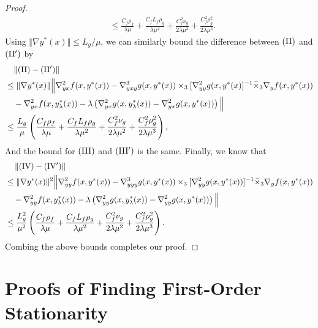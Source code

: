 \begin{proof}
\begin{align*}
    &\le \frac{C_f \rho_f}{\lambda \mu} + \frac{C_f L_f \rho_g}{\lambda \mu^2} +  \frac{C_f^2 \nu_g}{2\lambda \mu^2}+ \frac{C_f^2 \rho_g^2}{2 \lambda \mu^3} .
\end{align*}
Using $\Vert \nabla y^*(x) \Vert \le  L_g / \mu$, we can similarly bound the difference between ${\rm (II)}$ and ${\rm (II')}$ by
{ \begin{align*}
    &\quad \lVert{\rm (II)} - {\rm (II')}\rVert \\
    &\le 
      \Vert \nabla y^*(x) \Vert \Big \Vert  \nabla_{yx}^2 f(x,y^*(x)) - \nabla_{yxy}^3 g(x,y^*(x)) \times_3 [\nabla_{yy}^2 g(x,y^*(x)]^{-1} \bar \times_3 \nabla_y f(x,y^*(x))\\
     &\quad - \nabla_{yx}^2 f(x,y_{\lambda}^*(x))-\lambda  \left(\nabla_{yx}^2 g(x,y_{\lambda}^*(x))-\nabla_{yx}^2 g(x,y^*(x)) \right) \Big \Vert \\
     & \le \frac{L_g }{\mu} \left( \frac{C_f \rho_f}{\lambda \mu} + \frac{C_f L_f \rho_g}{\lambda \mu^2}  + \frac{C_f^2 \nu_g}{2\lambda \mu^2} +\frac{C_f^2 \rho_g^2}{2 \lambda \mu^3} \right),
\end{align*}}
And the bound for ${\rm(III)}$ and $ {\rm (III')}$ is the same. Finally, we know that
\begin{align*}
    &\quad \left \Vert {\rm (IV)} - {\rm (IV')} \right \Vert \\
    &\le \Vert \nabla y^*(x) \Vert^2 \Big \Vert \nabla_{yy}^2 f(x,y^*(x)) - \nabla_{yyy}^3 g(x,y^*(x)) \times_3 [ \nabla_{yy}^2 g(x,y^*(x))]^{-1} \bar \times_3 \nabla_y f(x,y^*(x))  \\
    &\quad - \nabla_{yy}^2 f(x,y_{\lambda}^*(x)) - \lambda \left( \nabla_{yy}^2 g(x,y_{\lambda}^*(x)) - \nabla_{yy}^2 g(x,y^*(x)) \right) \Big \Vert \\
    &\le \frac{L_g^2}{\mu^2} \left( \frac{C_f \rho_f}{\lambda \mu} + \frac{C_f L_f \rho_g}{\lambda \mu^2}  + \frac{C_f^2 \nu_g}{2\lambda \mu^2} +  \frac{C_f^2 \rho_g^2}{2 \lambda \mu^3}\right).
\end{align*}
Combing the above bounds completes our proof.
\end{proof}

\section{Proofs of Finding First-Order Stationarity} \label{apx:1st}

